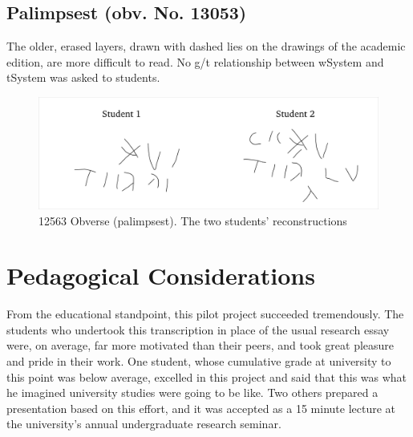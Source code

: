 \documentclass[amsthm,ebook]{saparticle}
\begin{document}

\subsection{Palimpsest (obv. No. 13053)}



The older, erased layers, drawn with dashed lies on the drawings of the academic edition, are more difficult to read. No
g/t relationship between wSystem and tSystem was asked to students.

\begin{figure}[!bp]
\centering
\includegraphics[scale=0.25]{EAGLE16lameetalteaching-img012.png}
\caption{12563 Obverse (palimpsest). The two students' reconstructions}
\label{fig:4}
\end{figure}


\section{Pedagogical Considerations}


\noindent From the educational standpoint, this pilot project succeeded tremendously. The students who undertook this
transcription in place of the usual research essay were, on average, far more motivated than their peers, and took
great pleasure and pride in their work. One student, whose cumulative grade at university to this point was below
average, excelled in this project and said that this was what he imagined university studies were going to be like. Two
others prepared a presentation based on this effort, and it was accepted as a 15 minute lecture at the university’s
annual undergraduate research seminar.
\end{document}
